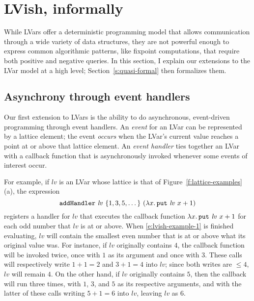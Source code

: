 \section{LVish, informally}\label{s:quasi-informal}

While LVars offer a deterministic programming model that allows
communication through a wide variety of data structures, they are not
powerful enough to express common algorithmic patterns, like fixpoint
computations, that require both positive and negative queries.  In
this section, I explain our extensions to the LVar model at a high
level; Section~\ref{s:quasi-formal} then formalizes them.

\subsection{Asynchrony through event handlers}

Our first extension to LVars is the ability to do asynchronous,
event-driven programming through event handlers.  An \emph{event} for
an LVar can be represented by a lattice element; the event
\emph{occurs} when the LVar's current value reaches a point at or
above that lattice element.  An \emph{event handler} ties together an
LVar with a callback function that is asynchronously invoked whenever
some events of interest occur.



For example, if $\mathit{lv}$ is an LVar whose lattice is that of
Figure~\ref{f:lattice-examples}(a), the expression
\begin{equation}
  {\mbox{\texttt{addHandler}}}~\mathit{lv}~\{ 1, 3, 5, \dots \}~(\lambda x.\,\mbox{\texttt{put}}~\mathit{lv}~x+1)
\label{e:lvish-example-1}
\end{equation}
registers a handler for $\mathit{lv}$ that executes the callback
function $\lambda x.\,\mbox{\texttt{put}}~\mathit{lv}~x+1$ for each odd number that
$\mathit{lv}$ is at or above.  When \ref{e:lvish-example-1} is
finished evaluating, $\mathit{lv}$ will contain the smallest even
number that is at or above what its original value was.  For instance,
if $\mathit{lv}$ originally contains $4$, the callback function will
be invoked twice, once with $1$ as its argument and once with $3$.
These calls will respectively write $1+1 = 2$ and $3+1 = 4$ into
$\mathit{lv}$; since both writes are $\leq 4$, $\mathit{lv}$ will
remain $4$.  On the other hand, if $\mathit{lv}$ originally contains
$5$, then the callback will run three times, with $1$, $3$, and $5$ as
its respective arguments, and with the latter of these calls writing
$5+1 = 6$ into $\mathit{lv}$, leaving $\mathit{lv}$ as $6$.

